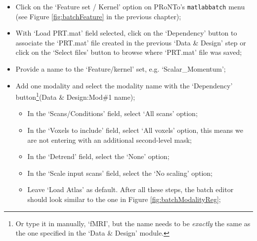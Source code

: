 \begin{itemize}

    \item Click on the `Feature set / Kernel' option on PRoNTo's {\tt matlabbatch} menu (see Figure \ref{fig:batchFeature} in the previous chapter);
    
     \item With `Load PRT.mat' field selected, click on the `Dependency' button to associate the `PRT.mat' file created in the previous `Data \& Design' step or click on the `Select files' button to browse where `PRT.mat' file was saved;

    \item Provide a name to the `Feature/kernel' set, e.g. `Scalar\_Momentum';
    
    \item Add one modality and select the modality name with the `Dependency' button\footnote{Or type it in manually, `fMRI', but the name needs to be {\it exactly} the same as the one specified in the `Data \& Design' module.}(Data \& Design:Mod\#1 name);
	
		\begin{itemize}
	
	\item In the `Scans/Conditions' field, select `All scans' option;
	
	\item In the `Voxels to include' field, select `All voxels' option, this means we are not entering with an additional second-level mask;
	
	\item In the `Detrend' field, select the `None' option;
	
	\item In the `Scale input scans' field, select the `No scaling' option;
	
	\item Leave `Load Atlas' as default. After all these steps, the batch editor should look similar to the one in Figure \ref{fig:batchModalityReg};
	

\end{itemize}
\end{itemize}
